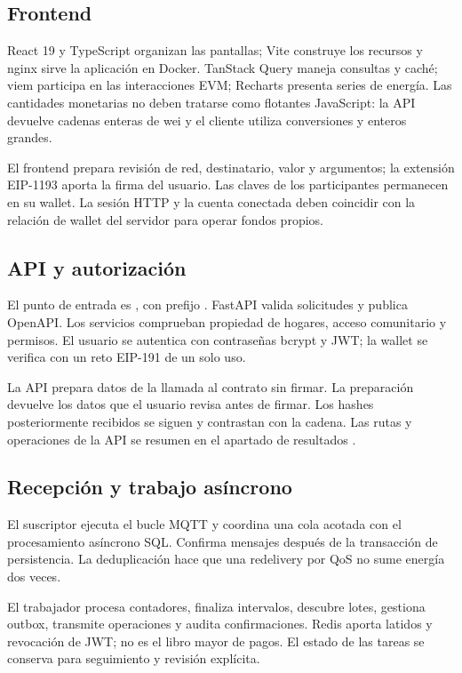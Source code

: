 \subsection{Frontend}
React 19 y TypeScript organizan las pantallas; Vite construye los recursos y nginx sirve la aplicación en Docker. TanStack Query maneja consultas y caché; viem participa en las interacciones EVM; Recharts presenta series de energía. Las cantidades monetarias no deben tratarse como flotantes JavaScript: la API devuelve cadenas enteras de wei y el cliente utiliza conversiones y enteros grandes.

El frontend prepara revisión de red, destinatario, valor y argumentos; la extensión EIP-1193 aporta la firma del usuario. Las claves de los participantes permanecen en su wallet. La sesión HTTP y la cuenta conectada deben coincidir con la relación de wallet del servidor para operar fondos propios.

\subsection{API y autorización}
El punto de entrada es , con prefijo . FastAPI valida solicitudes y publica OpenAPI. Los servicios comprueban propiedad de hogares, acceso comunitario y permisos. El usuario se autentica con contraseñas bcrypt y JWT; la wallet se verifica con un reto EIP-191 de un solo uso.

La API prepara datos de la llamada al contrato sin firmar. La preparación devuelve los datos que el usuario revisa antes de firmar. Los hashes posteriormente recibidos se siguen y contrastan con la cadena. Las rutas y operaciones de la API se resumen en el apartado de resultados \citep{api}.

\subsection{Recepción y trabajo asíncrono}
El suscriptor ejecuta el bucle MQTT y coordina una cola acotada con el procesamiento asíncrono SQL. Confirma mensajes después de la transacción de persistencia. La deduplicación hace que una redelivery por QoS no sume energía dos veces.

El trabajador procesa contadores, finaliza intervalos, descubre lotes, gestiona outbox, transmite operaciones y audita confirmaciones. Redis aporta latidos y revocación de JWT; no es el libro mayor de pagos. El estado de las tareas se conserva para seguimiento y revisión explícita.


